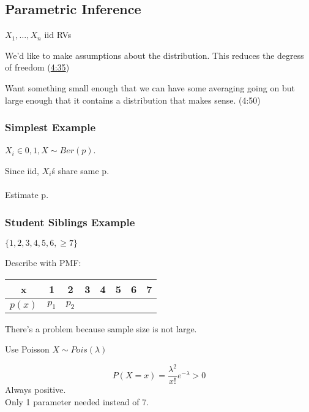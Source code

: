 

\subsection{Parametric Inference}

$X_1, \ldots, X_n$ iid RVs

We'd like to make assumptions about the distribution.  This reduces the degress of freedom (\href{https://youtu.be/TSkDZbGS94k?t=4m35s}{4:35})

Want something small enough that we can have some averaging going on but large enough that it contains a distribution that makes sense. (4:50)

\subsubsection*{Simplest Example }


$X_i \in {0,1}, X \sim Ber(p)$. 

Since iid, $X_i$\'s share same p.\\\\
Estimate p.
\\

\subsubsection{Student Siblings Example}

$\{1,2,3,4,5,6, \ge 7\}$

Describe with PMF:

\begin{center}
\begin{tabular}{ |c|c|c|c|c|c|c|c| } 
 \hline 
 x & 1 & 2 & 3 & 4 &5 &6 &7 \\ 
  \hline 
 $p(x)$ & $p_1$ & $p_2$ & \\ 
\end{tabular}
\end{center}
There's a problem because sample size is not large.


Use Poisson $X \sim Pois(\lambda)$

$$P(X=x)=\frac{\lambda^2}{x!}e^{-\lambda} > 0$$
Always positive.\\
Only 1 parameter needed instead of 7.

